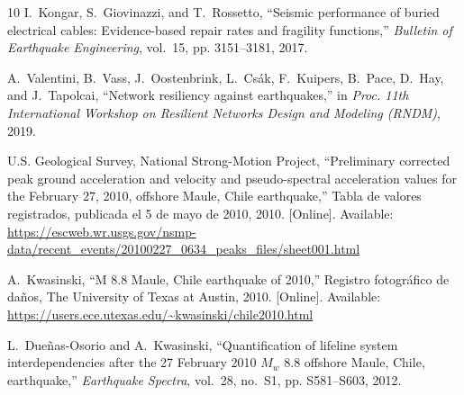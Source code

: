\documentclass[conference]{IEEEtran}
\begin{document}
\begin{thebibliography}{10}
I.~Kongar, S.~Giovinazzi, and T.~Rossetto, ``Seismic performance of buried
  electrical cables: Evidence-based repair rates and fragility functions,''
  \emph{Bulletin of Earthquake Engineering}, vol.~15, pp. 3151--3181, 2017.

A.~Valentini, B.~Vass, J.~Oostenbrink, L.~Cs{\'a}k, F.~Kuipers, B.~Pace,
  D.~Hay, and J.~Tapolcai, ``Network resiliency against earthquakes,'' in
  \emph{Proc. 11th International Workshop on Resilient Networks Design and
  Modeling (RNDM)}, 2019.

\BIBentryALTinterwordspacing
{U.S. Geological Survey, National Strong-Motion Project}, ``Preliminary
  corrected peak ground acceleration and velocity and pseudo-spectral
  acceleration values for the {February} 27, 2010, offshore {Maule}, {Chile}
  earthquake,'' Tabla de valores registrados, publicada el 5 de mayo de 2010,
  2010. [Online]. Available:
  \url{https://escweb.wr.usgs.gov/nsmp-data/recent_events/20100227_0634_peaks_files/sheet001.html}
\BIBentrySTDinterwordspacing

\BIBentryALTinterwordspacing
A.~Kwasinski, ``M 8.8 {Maule}, {Chile} earthquake of 2010,'' Registro
  fotográfico de daños, The University of Texas at Austin, 2010. [Online].
  Available: \url{https://users.ece.utexas.edu/~kwasinski/chile2010.html}
\BIBentrySTDinterwordspacing

L.~Due{\~n}as-Osorio and A.~Kwasinski, ``Quantification of lifeline system
  interdependencies after the 27 {February} 2010 {$M_w$} 8.8 offshore {Maule},
  {Chile}, earthquake,'' \emph{Earthquake Spectra}, vol.~28, no.~S1, pp.
  S581--S603, 2012.

\end{thebibliography}
\end{document}
